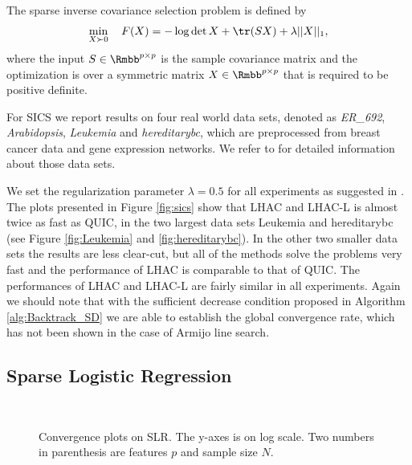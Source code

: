 \documentclass[11pt]{article}
\numberwithin{equation}{section}
\begin{document}
The sparse inverse covariance selection problem is defined by
\begin{align}
    \label{equ:sics_obj}
    \min_{X \succ 0} \quad F(X) = -\log \det X + \tr(SX) + \lambda ||X||_1,
\end{align}
where the input $S \in \Rmbb^{p \times p}$ is the sample covariance matrix and the optimization is over a symmetric matrix  $X \in \Rmbb^{p \times p}$ that is required to be positive definite.

For SICS we report results on four real world data sets, denoted as \emph{ER\_692}, \emph{Arabidopsis}, \emph{Leukemia} and \emph{hereditarybc}, which are preprocessed from breast cancer data and gene expression networks. We refer to \cite{Li2010} for detailed information about those data sets.


We set the regularization parameter $\lambda = 0.5$ for all experiments as suggested in \cite{Li2010}. 
The plots presented in Figure \ref{fig:sics} show that LHAC and LHAC-L is almost twice as fast as QUIC,  in the two largest data sets Leukemia and hereditarybc (see Figure \ref{fig:Leukemia} and \ref{fig:hereditarybc}). In the other two smaller data sets the results are less clear-cut, but all of the methods solve the problems very fast and the performance of LHAC is comparable to that of QUIC. The performances of LHAC and LHAC-L are fairly similar in all experiments. Again we should note that with the sufficient decrease condition proposed in Algorithm \ref{alg:Backtrack_SD} we are able to establish the global convergence rate, which has not been shown  in the case of Armijo line search.

\subsection{Sparse Logistic Regression} %
\label{sub:sparse_logistic_regression}
\begin{figure}[!t]
    \centering
    ~
    ~    
    ~
    \caption{ Convergence plots on SLR. The y-axes is on log scale. Two numbers in parenthesis are features $p$ and sample size $N$. }
    \label{fig:log_reg2}
\end{figure}
\end{document}
